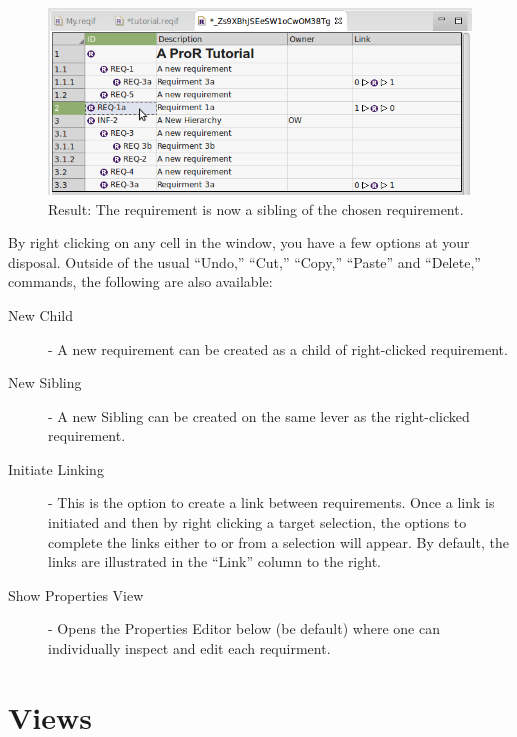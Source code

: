 {{{\begin{figure}[!h]
\end{figure}
\begin{figure}[!h]
  \centering
  \includegraphics[width=\linewidth]{../rmf-images/hierarchy_step_4.png}
  \caption{Result: The requirement is now a sibling of the chosen requirement.}
  \label{fig:hierarchy_step_1}
\end{figure}

By right clicking on any cell in the window, you have a few options at your disposal. Outside of the usual ``Undo,'' ``Cut,'' ``Copy,'' ``Paste'' and ``Delete,'' commands, the following are also available:

\begin{description}

\item
  [New Child] - A new requirement can be created as a child of right-clicked requirement.
\item
  [New Sibling] - A new Sibling can be created on the same lever as the right-clicked requirement.
\item
  [Initiate Linking] - This is the option to create a link between requirements. Once a link is initiated and then by right clicking a target selection, the options to complete the links either to or from a selection will appear. By default, the links are illustrated in the ``Link'' column to the right. 
\item
  [Show Properties View] - Opens the Properties Editor below (be default) where one can individually inspect and edit each requirment.
\end{description}


\section{Views}

}}}
